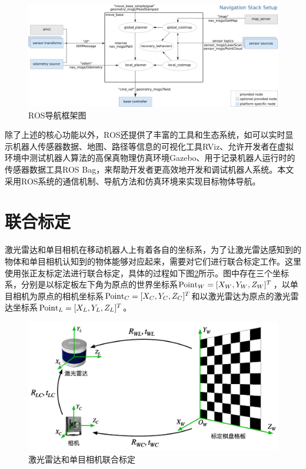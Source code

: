 \begin{figure}[htbp]
    \centering
    \includegraphics[scale=0.50]{Fig/ROSNavstack.png}
    \caption{\label{fROSNavstack}ROS导航框架图}
\end{figure}


除了上述的核心功能以外，ROS还提供了丰富的工具和生态系统，如可以实时显示机器人传感器数据、地图、路径等信息的可视化工具RViz、允许开发者在虚拟环境中测试机器人算法的高保真物理仿真环境Gazebo、用于记录机器人运行时的传感器数据工具ROS Bag，来帮助开发者更高效地开发和调试机器人系统。本文采用ROS系统的通信机制、导航方法和仿真环境来实现目标物体导航。


\section{联合标定}
激光雷达和单目相机在移动机器人上有着各自的坐标系，为了让激光雷达感知到的物体和单目相机认知到的物体能够对应起来，需要对它们进行联合标定工作。这里使用张正友标定法\cite{zhang2002flexible}进行联合标定，具体的过程如下图\ref{Calibration}所示。图中存在三个坐标系，分别是以标定板左下角为原点的世界坐标系${\rm{Poin}}{{\rm{t}}_W} = {[{X_W},{Y_W},{Z_W}]^T}$，以单目相机为原点的相机坐标系${\rm{Poin}}{{\rm{t}}_C} = {[{X_C},{Y_C},{Z_C}]^T}$和以激光雷达为原点的激光雷达坐标系${\rm{Poin}}{{\rm{t}}_L} = {[{X_L},{Y_L},{Z_L}]^T}$。
\begin{figure}[htbp]
    \centering
    \includegraphics[scale=0.50]{Fig/joinCalibration.png}
    \caption{\label{Calibration}激光雷达和单目相机联合标定}
\end{figure}

